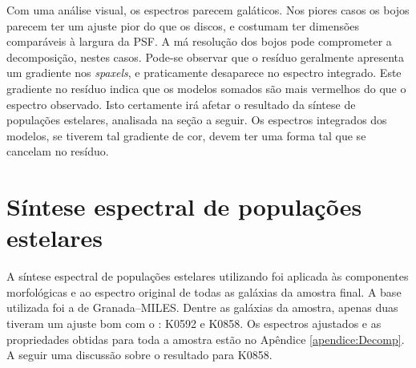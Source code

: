 Com uma análise visual, os espectros parecem galáticos. Nos piores casos os
bojos parecem ter um ajuste pior do que os discos, e costumam ter dimensões
comparáveis à largura da PSF. A má resolução dos bojos pode comprometer a
decomposição, nestes casos. Pode-se observar que o resíduo geralmente apresenta
um gradiente nos {\em spaxels}, e praticamente desaparece no espectro integrado.
Este gradiente no resíduo indica que os modelos somados são mais vermelhos do
que o espectro observado. Isto certamente irá afetar o resultado da síntese de
populações estelares, analisada na seção a seguir. Os espectros integrados dos
modelos, se tiverem tal gradiente de cor, devem ter uma forma tal que se
cancelam no resíduo.

\section{Síntese espectral de populações estelares}
\label{sec:Decomp:sintese}

A síntese espectral de populações estelares utilizando \starlight foi aplicada
às componentes morfológicas e ao espectro original de todas as galáxias da
amostra final. A base utilizada foi a de Granada--MILES. Dentre as galáxias da
amostra, apenas duas tiveram um ajuste bom com o \starlight: K0592 e K0858. Os
espectros ajustados e as propriedades obtidas para toda a amostra estão no
Apêndice \ref{apendice:Decomp}. A seguir uma discussão sobre o resultado para
K0858.

